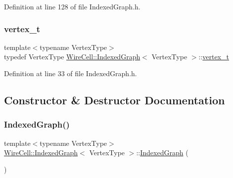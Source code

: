 Definition at line 128 of file Indexed\+Graph.\+h.

\mbox{\label{class_wire_cell_1_1_indexed_graph_ac26b25ac103373dde929a982d948d1b5}} 
\subsubsection{\texorpdfstring{vertex\+\_\+t}{vertex\_t}}
{\footnotesize\ttfamily template$<$typename Vertex\+Type$>$ \\
typedef Vertex\+Type \hyperlink{class_wire_cell_1_1_indexed_graph}{Wire\+Cell\+::\+Indexed\+Graph}$<$ Vertex\+Type $>$\+::\hyperlink{class_wire_cell_1_1_indexed_graph_ac26b25ac103373dde929a982d948d1b5}{vertex\+\_\+t}}



Definition at line 33 of file Indexed\+Graph.\+h.



\subsection{Constructor \& Destructor Documentation}
\mbox{\label{class_wire_cell_1_1_indexed_graph_a010abbec94dc4a91d471fe6a3131370a}} 
\subsubsection{\texorpdfstring{Indexed\+Graph()}{IndexedGraph()}\hspace{0.1cm}{\footnotesize\ttfamily [1/2]}}
{\footnotesize\ttfamily template$<$typename Vertex\+Type$>$ \\
\hyperlink{class_wire_cell_1_1_indexed_graph}{Wire\+Cell\+::\+Indexed\+Graph}$<$ Vertex\+Type $>$\+::\hyperlink{class_wire_cell_1_1_indexed_graph}{Indexed\+Graph} (\begin{DoxyParamCaption}{ }\end{DoxyParamCaption})\hspace{0.3cm}{\ttfamily [inline]}}



